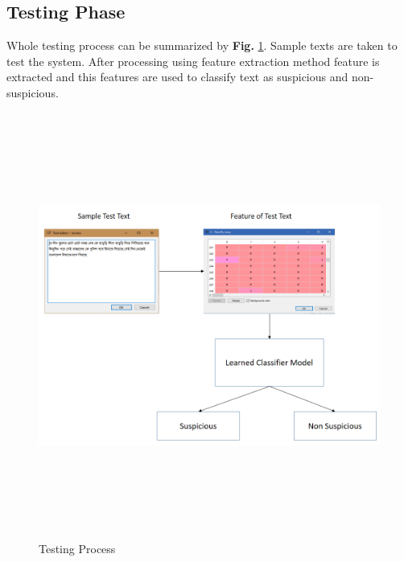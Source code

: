 \documentclass[12pt,a4paper]{report}
\begin{document}
\subsection{Testing Phase}
Whole testing process can be summarized by \textbf{Fig.} \ref{fig:TEP}. Sample texts are taken to test the system. After processing using feature extraction method feature is extracted and this features are used to classify text as suspicious and non-suspicious.
\begin{figure}[h!]
    \centering
    \includegraphics[width=15cm,height=14cm]{Figures/testing_phase.PNG}
    \caption{Testing Process}
    \label{fig:TEP}
\end{figure}
\end{document}

